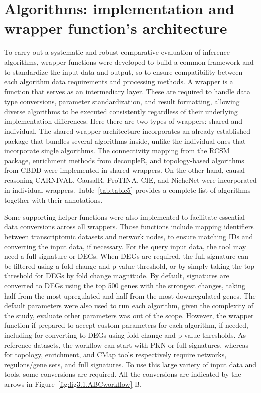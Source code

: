 \section{Algorithms: implementation and wrapper function's architecture} %
\label{sec:algorithms}

To carry out a systematic and robust comparative evaluation of inference algorithms, wrapper functions were developed to build a common framework and to standardize the input data and output, so to ensure compatibility between each algorithm data requirements and processing methods. 
A wrapper is a function that serves as an intermediary layer. 
These are required to handle data type conversions, parameter standardization, and result formatting, allowing diverse algorithms to be executed consistently regardless of their underlying implementation differences.
Here there are two types of wrappers: shared and individual. The shared wrapper architecture incorporates an already established package that bundles several algorithms inside, unlike the individual ones that incorporate single algorithms. The connectivity mapping from the \gls{RCSM} package, enrichment methods from decoupleR, and topology-based algorithms from \gls{CBDD} were implemented in shared wrappers. On the other hand, causal reasoning \gls{CARNIVAL}, CausalR, \gls{ProTINA}, \gls{CIE}, and NicheNet were incorporated in individual wrappers. Table~\ref{tab:table5} provides a complete list of algorithms together with their annotations.

Some supporting helper functions were also implemented to facilitate essential data conversions across all wrappers.
Those functions include mapping identifiers between transcriptomic datasets and network nodes, to ensure matching IDs and converting the input data, if necessary.
For the query input data, the tool may need a full signature or \gls{DEGs}. When \gls{DEGs} are required, the full signature can be filtered using a fold change and p-value threshold, or by simply taking the top threshold for \gls{DEGs} by fold change magnitude.
By default, signatures are converted to \gls{DEGs} using the top 500 genes with the strongest changes, taking half from the most upregulated and half from the most downregulated genes.
The default parameters were also used to run each algorithm, given the complexity of the study, evaluate other parameters was out of the scope. However, the wrapper function if prepared to accept custom parameters for each algorithm, if needed, including for converting to \gls{DEGs} using fold change and p-value thresholds.
As reference datasets, the workflow can start with PKN or full signatures, whereas for topology, enrichment, and \gls{CMap} tools respectively require networks, regulons/gene sets, and full signatures.
To use this large variety of input data and tools, some conversions are required.
All the conversions are indicated by the arrows in Figure~\ref{fig:fig3.1.ABCworkflow} B.

